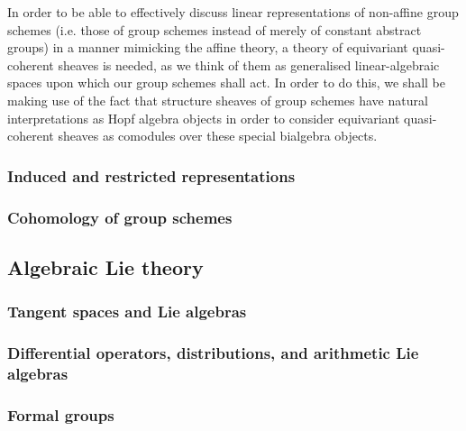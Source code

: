             In order to be able to effectively discuss linear representations of non-affine group schemes (i.e. those of group schemes instead of merely of constant abstract groups) in a manner mimicking the affine theory, a theory of equivariant quasi-coherent sheaves is needed, as we think of them as generalised linear-algebraic spaces upon which our group schemes shall act. In order to do this, we shall be making use of the fact that structure sheaves of group schemes have natural interpretations as Hopf algebra objects in order to consider equivariant quasi-coherent sheaves as comodules over these special bialgebra objects. 
            
        \subsubsection{Induced and restricted representations}
        
        \subsubsection{Cohomology of group schemes}
        
    \subsection{Algebraic Lie theory}
        \subsubsection{Tangent spaces and Lie algebras}
        
        \subsubsection{Differential operators, distributions, and arithmetic Lie algebras}
        
        \subsubsection{Formal groups}